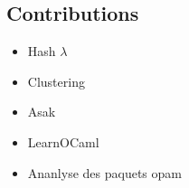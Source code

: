 
\subsection{Contributions}
\begin{itemize}
\item Hash $ \lambda$
\item Clustering
\item Asak
\item LearnOCaml
\item Ananlyse des paquets opam
\end{itemize}